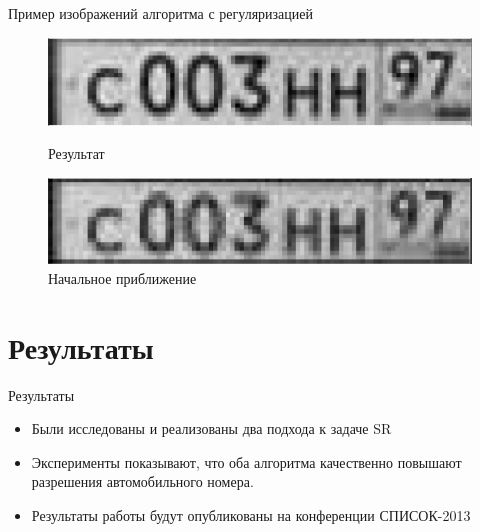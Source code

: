 \begin{frame}{Пример изображений алгоритма с регуляризацией}
  \begin{figure}
    \caption{Результат}
    \includegraphics[width=\columnwidth]{content/sr2_two_1.png}\\
  \end{figure}
  \begin{figure}
    \caption{Начальное приближение}
    \includegraphics[width=\columnwidth]{content/sr2_two_2.png}
  \end{figure}
\end{frame}

\section{Результаты}

\begin{frame}{Результаты}
  \begin{itemize}
    \item Были исследованы и реализованы два подхода к задаче SR
    \item Эксперименты показывают, что оба алгоритма качественно повышают разрешения автомобильного
      номера.
    \item Результаты работы будут опубликованы на конференции СПИСОК-2013
  \end{itemize}
\end{frame}
